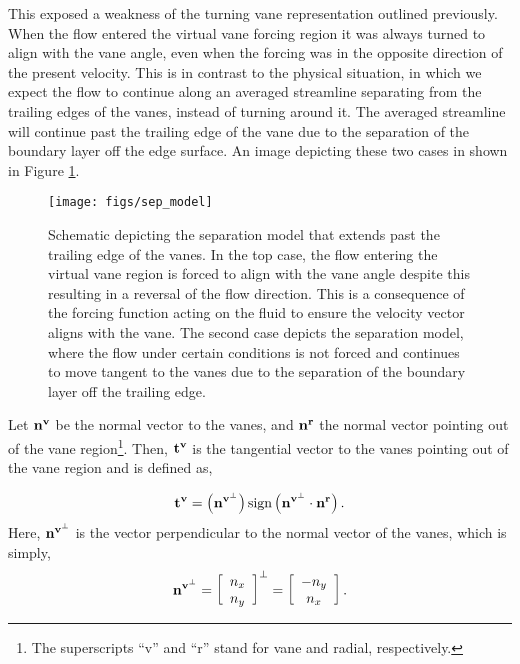 This exposed a weakness of the turning vane representation outlined
previously. When the flow entered the virtual vane forcing region it was
always turned to align with the vane angle, even when the forcing was in
the opposite direction of the present velocity.
This is in contrast to the physical situation, in which we
expect the flow to continue along an averaged streamline separating from the 
trailing edges of the vanes, instead of turning around it. 
The averaged streamline will continue past the trailing edge of the vane
due to the separation of the boundary layer off the edge surface. An
image depicting these two cases in shown in Figure \ref{fig:sep_model}.  

\begin{figure}[!htb]
  \begin{center}
    \texttt{[image: figs/sep\_model]}
    \caption{Schematic depicting the separation model that extends past
   the trailing edge of the vanes. In the top case, the flow entering
   the virtual vane region is forced to align with the vane angle despite
   this resulting in a reversal of the flow direction. This is a
   consequence of the forcing function acting on the fluid to ensure the
   velocity vector aligns with the vane. 
   The second case depicts the separation
   model, where the flow under certain conditions is not forced and
   continues to move tangent to the vanes due to 
   the separation of the boundary layer off the trailing edge.} 
    \label{fig:sep_model}
  \end{center}
\end{figure}

Let $\bf n^v$ be the normal vector to the vanes,
and $\bf n^r$ the normal vector pointing out of the vane
region\footnote{\normalsize The superscripts ``v'' and ``r'' stand for
vane and radial, respectively.}.  
Then, $\bf t^v$ is the tangential vector to the vanes pointing out of
the vane region and is defined as,

\begin{equation}
 \bf t^v = \left( {\bf n^{v^\perp}} \right) \text{sign}\left(
	    {\bf n^{v^\perp}} \cdot {\bf n^r} \right).
\end{equation}
Here, ${\bf n^{v^\perp}}$ is the vector perpendicular to the normal
vector of the vanes, which is simply, 
\begin{equation*}
 {\bf n^{v^\perp}} = \left[ \begin{array}{c}
n_x\\
n_y\\
\end{array}\right]^{\perp} = 
 \left[ \begin{array}{c}
  -n_y\\
  n_x\\
	\end{array}\right].
\end{equation*}

